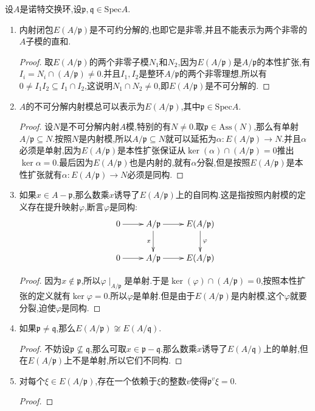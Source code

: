 设$A$是诺特交换环,设$\mathfrak{p},\mathfrak{q}\in\mathrm{Spec}A$.
\begin{enumerate}
	\item 内射闭包$E(A/\mathfrak{p})$是不可约分解的,也即它是非零,并且不能表示为两个非零的$A$子模的直和.
	\begin{proof}
		
		取$E(A/\mathfrak{p})$的两个非零子模$N_1$和$N_2$,因为$E(A/\mathfrak{p})$是$A/\mathfrak{p}$的本性扩张,有$I_i=N_i\cap(A/\mathfrak{p})\not=0$.并且$I_1,I_2$是整环$A/\mathfrak{p}$的两个非零理想,所以有$0\not=I_1I_2\subseteq I_1\cap I_2$,这说明$N_1\cap N_2\not=0$,即$E(A/\mathfrak{p})$是不可分解的.
	\end{proof}
    \item $A$的不可分解内射模总可以表示为$E(A/\mathfrak{p})$,其中$\mathfrak{p}\in\mathrm{Spec}A$.
    \begin{proof}
    	
    	设$N$是不可分解内射$A$模,特别的有$N\not=0$.取$\mathfrak{p}\in\mathrm{Ass}(N)$,那么有单射$A/\mathfrak{p}\subseteq N$.按照$N$是内射模,所以$A/\mathfrak{p}\subseteq N$就可以延拓为$\alpha:E(A/\mathfrak{p})\to N$.并且$\alpha$必须是单射,因为$E(A/\mathfrak{p})$是本性扩张保证从$\ker(\alpha)\cap(A/\mathfrak{p})=0$推出$\ker\alpha=0$.最后因为$E(A/\mathfrak{p})$也是内射的,就有$\alpha$分裂,但是按照$E(A/\mathfrak{p})$是本性扩张就有$\alpha:E(A/\mathfrak{p})\to N$必须是同构.
    \end{proof}
    \item 如果$x\in A-\mathfrak{p}$,那么数乘$x$诱导了$E(A/\mathfrak{p})$上的自同构.这是指按照内射模的定义存在提升映射$\varphi$,断言$\varphi$是同构:
    $$\xymatrix{0\ar[r]&A/\mathfrak{p}\ar[r]\ar[d]_{x}&E(A/\mathfrak{p})\ar[d]^{\varphi}\\0\ar[r]&A/\mathfrak{p}\ar[r]&E(A/\mathfrak{p})}$$
    \begin{proof}
    	
    	因为$x\not\in\mathfrak{p}$,所以$\varphi\mid_{A/\mathfrak{p}}$是单射.于是$\ker(\varphi)\cap(A/\mathfrak{p})=0$,按照本性扩张的定义就有$\ker\varphi=0$.所以$\varphi$是单射.但是由于$E(A/\mathfrak{p})$是内射模,这个$\varphi$就要分裂,迫使$\varphi$是同构.
    \end{proof}
    \item 如果$\mathfrak{p}\not=\mathfrak{q}$,那么$E(A/\mathfrak{p})\not\cong E(A/\mathfrak{q})$.
    \begin{proof}
    	
    	不妨设$\mathfrak{p}\not\subseteq\mathfrak{q}$,那么可取$x\in\mathfrak{p}-\mathfrak{q}$.那么数乘$x$诱导了$E(A/\mathfrak{q})$上的单射,但在$E(A/\mathfrak{p})$上不是单射,所以它们不同构.
    \end{proof}
    \item 对每个$\xi\in E(A/\mathfrak{p})$,存在一个依赖于$\xi$的整数$v$使得$\mathfrak{p}^v\xi=0$.
    \begin{proof}
    	

\end{proof}
\end{enumerate}
